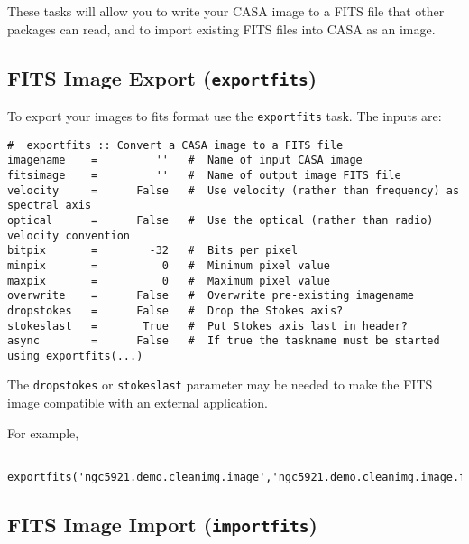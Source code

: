 These tasks will allow you to write your CASA image to a FITS file
that other packages can read, and to import existing FITS files
into CASA as an image.

\subsection{FITS Image Export ({\tt exportfits})}
\label{section:analysis.fits.export}

To export your images to fits format use the {\tt exportfits} task.
The inputs are:
\small
\begin{verbatim}
#  exportfits :: Convert a CASA image to a FITS file
imagename    =         ''   #  Name of input CASA image
fitsimage    =         ''   #  Name of output image FITS file
velocity     =      False   #  Use velocity (rather than frequency) as spectral axis
optical      =      False   #  Use the optical (rather than radio) velocity convention
bitpix       =        -32   #  Bits per pixel
minpix       =          0   #  Minimum pixel value
maxpix       =          0   #  Maximum pixel value
overwrite    =      False   #  Overwrite pre-existing imagename
dropstokes   =      False   #  Drop the Stokes axis?
stokeslast   =       True   #  Put Stokes axis last in header?
async        =      False   #  If true the taskname must be started using exportfits(...)
\end{verbatim}
\normalsize

The {\tt dropstokes} or {\tt stokeslast} parameter may be needed to
make the FITS image compatible with an external application.

For example,
\small
\begin{verbatim}
   exportfits('ngc5921.demo.cleanimg.image','ngc5921.demo.cleanimg.image.fits')
\end{verbatim}
\normalsize


\subsection{FITS Image Import ({\tt importfits})}
\label{section:analysis.fits.import}

